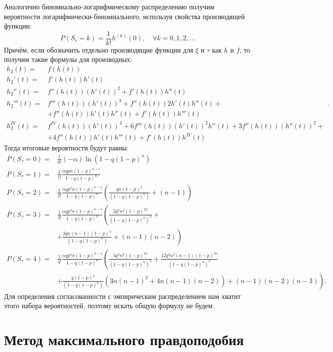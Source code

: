 \documentclass[12pt, specialist, subf, substylefile = spbu_report.rtx]{disser}
\begin{document}
	Аналогично биномиально-логарифмическому распределению получим вероятности логарифмически-биномиального, используя свойства производящей функции:
	\[ P(S _\tau = k) = \frac {1} {k!} h ^{(k)} (0), \quad \forall k = 0, 1, 2, \dots \]
	Причём, если обозначить отдельно производящие функции для $ \xi $ и $ \tau $ как $ h $ и $ f $, то получим такие формулы для производных:
	\[
	\begin{aligned}
	 	h _2(t)=& f(h(t))\\
	 	h _2'(t)=& f'(h(t))h'(t)\\
	 	h _2''(t)=& f''(h(t))(h'(t))^2+f'(h(t))h''(t)\\
	 	h _2'''(t)=& f'''(h(t))(h'(t))^3+f''(h(t))2h'(t)h''(t)+\\
	 	& +f''(h(t))h'(t)h''(t)+f'(h(t))h'''(t)\\
	 	h _2^{IV}(t)=& f^{IV}(h(t))(h'(t))^4+6f'''(h(t))(h'(t))^2h''(t)+3f''(h(t))(h''(t))^2+\\
	 	& +4f''(h(t))h'(t)h'''(t)+f'(h(t))h^{IV}(t)
	\end{aligned}.
	\]
	Тогда итоговые вероятности будут равны:
	\[
	\begin{aligned}
	 	P(S _\tau = 0)=& \frac 1 {0!} (-\alpha) \ln (1 - q (1 - p) ^n)\\
	 	P(S _\tau = 1)=& \frac 1 {1!} \frac {\alpha q p n (1 - p) ^{n - 1}} {1 - q (1 - p) ^n}\\
	 	P(S _\tau = 2)=& \frac 1 {2!} \frac {\alpha q p ^2 n (1 - p) ^{n - 2}} {1 - q (1 - p) ^n} \left( \frac {qn (1 - p) ^n} {(1 - q (1 - p) ^n)} + (n - 1) \right)\\
	 	P(S _\tau = 3)=& \frac 1 {3!} \frac {\alpha q p ^3 n (1 - p) ^{n - 3}} {1 - q (1 - p) ^n} \left( \frac {2q^2n^2 (1 - p) ^{2n}} {(1 - q (1 - p) ^n)^2} +\right.\\
	 	&\left.+ \frac {3qn (n - 1) (1 - p) ^n} {(1 - q (1 - p) ^n)} + (n - 1)(n - 2) \right)\\
	 	P(S _\tau = 4)=& \frac 1 {4!} \frac {\alpha q p ^4 n (1 - p) ^{n - 4}} {1 - q (1 - p) ^n} \left( \frac {3q^3n^3 (1 - p) ^{3n}} {(1 - q (1 - p) ^n)^3} + \frac {12q^2n^2 (n - 1) (1 - p) ^{2n}} {(1 - q (1 - p) ^n)^2}\right.\\
	 	&\left.+ \frac {q(1 - p) ^{n}} {(1 - q (1 - p) ^n)}\left(3n(n - 1) ^2 + 4n(n - 1)(n - 2)\right) + (n - 1)(n - 2)(n - 3) \right).
	\end{aligned}
	\]
	Для определения согласованности с эмпирическим распределением нам хватит этого набора вероятностей, поэтому искать общую формулу не будем.
	
	\section{Метод максимального правдоподобия}
	
\end{document}

